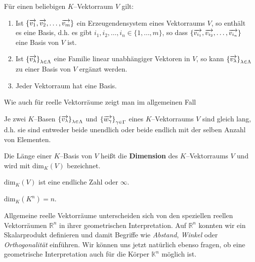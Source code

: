 \begin{satz}\label{basis_allg_vr_allg_koerper} Für einen beliebigen $K$--Vektorraum 
$V$ gilt:

\begin{enumerate}
\item Ist $\{ \overrightarrow{v_1}, \overrightarrow{v_2}, \ldots , \overrightarrow{v_m} \}$ ein 
Erzeugendensystem eines Vektorraums $V$, so enthält es eine Basis, d.h. es gibt $i_1, i_2, \ldots, i_n \in 
\{1, \ldots , m \}$, so dass $\{ \overrightarrow{v_{i_1}}, \overrightarrow{v_{i_2}}, \ldots , 
\overrightarrow{v_{i_n}} \}$ eine Basis von $V$ ist.
\item Ist $\left\{ \overrightarrow{v_{\lambda}} \right\}_{\lambda \in \Lambda}$ 
eine Familie linear unabhängiger Vektoren in $V$, so kann $\left\{ \overrightarrow{v_{\lambda}} 
\right\}_{\lambda \in \Lambda}$ zu einer Basis von $V$ ergänzt werden.
\item  Jeder Vektorraum hat eine Basis.
\end{enumerate}
\end{satz}

Wie auch für reelle Vektorräume zeigt man im allgemeinen Fall

\begin{satz} Je zwei $K$--Basen $\left\{ \overrightarrow{v_{\lambda}} \right\}_{\lambda \in \Lambda}$ und $\left\{ 
\overrightarrow{w_{\gamma}} \right\}_{\gamma \in \Gamma}$ eines $K$--Vektorraums 
$V$ sind gleich lang, d.h. sie sind entweder 
beide unendlich oder beide endlich mit der selben Anzahl von Elementen.
\end{satz}

\begin{definition} Die Länge einer $K$--Basis von $V$ heißt die \textbf{Dimension} 
des $K$--Vektorraums $V$ und wird mit $\textrm{dim}_K(V)$ bezeichnet.
\end{definition} 

\begin{notiz} $\textrm{dim}_K(V)$ ist eine endliche Zahl oder $\infty$.
\end{notiz}

\begin{beispiel} $\textrm{dim}_K(K^n) = n$.
\end{beispiel}

\bigbreak

Allgemeine reelle Vektorräume unterscheiden sich von den speziellen reellen 
Vektorräumen $\mathbb R^n$ in ihrer geometrischen Interpretation. Auf $\mathbb R^n$ 
konnten wir ein Skalarprodukt definieren und damit Begriffe wie \textit{Abstand}, 
\textit{Winkel} oder \textit{Orthogonalität} einführen. Wir können uns jetzt 
natürlich ebenso fragen, ob eine geometrische Interpretation auch für die 
Körper $\mathbb K^n$ möglich ist. 


